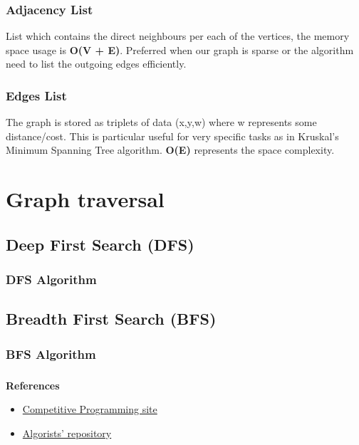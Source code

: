 \documentclass[article]{beamer}
\begin{document}
\begin{frame}
	\frametitle{Adjacency List}
	List which contains the direct neighbours per each of the vertices, the memory space usage is \textbf{O(V + E)}. Preferred when our graph is sparse or the algorithm need to list the outgoing edges efficiently. 
\end{frame}

\begin{frame}
	\frametitle{Edges List}
	The graph is stored as triplets of data (x,y,w) where w represents some distance/cost. This is particular useful for very specific tasks as in Kruskal's Minimum Spanning Tree algorithm. \textbf{O(E)} represents the space complexity.
\end{frame}

\section{Graph traversal}

\subsection{Deep First Search (DFS)}
\begin{frame}
	\frametitle{DFS Algorithm}
\end{frame}

\subsection{Breadth First Search (BFS)}
\begin{frame}
	\frametitle{BFS Algorithm}
\end{frame}

\begin{frame}[plain]
\frametitle{}
\begin{center}
\Huge{\color{blue}{Q \& A}}
\end{center}
\end{frame}

\begin{frame}[plain]
	\textbf{References}
	\begin{itemize}
		\item \href{https://sites.google.com/site/stevenhalim/}{Competitive Programming site}
		\item \href{https://github.com/davidjacobo/algorists/}{Algorists' repository}
	\end{itemize}
\end{frame}
\end{document}
